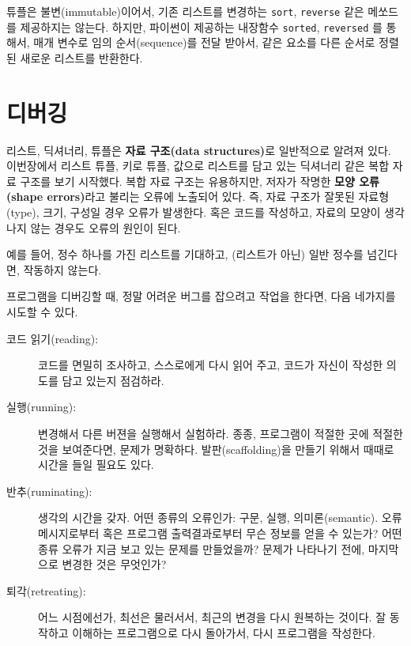 튜플은 불변(immutable)이어서, 기존 리스트를 변경하는 {\tt sort}, {\tt reverse} 같은 메쏘드를 제공하지는 않는다.
하지만, 파이썬이 제공하는 내장함수 {\tt sorted}, {\tt reversed} 를 통해서, 매개 변수로 임의 순서(sequence)를 전달 받아서, 같은 요소를 다른 순서로 정렬된 새로운 리스트를 반환한다.


\section{디버깅}


리스트, 딕셔너리, 튜플은 {\bf 자료 구조(data structures)}로 일반적으로 알려져 있다.
이번장에서 리스트 튜플, 키로 튜플, 값으로 리스트를 담고 있는 딕셔너리 같은 복합 자료 구조를 보기 시작했다.
복합 자료 구조는 유용하지만, 저자가 작명한 {\bf 모양 오류(shape errors)}라고 불리는 오류에 노출되어 있다.
즉, 자료 구조가 잘못된 자료형(type), 크기, 구성일 경우 오류가 발생한다. 
혹은 코드를 작성하고, 자료의 모양이 생각나지 않는 경우도 오류의 원인이 된다.

예를 들어, 정수 하나를 가진 리스트를 기대하고, (리스트가 아닌) 일반 정수를 넘긴다면, 작동하지 않는다.

프로그램을 디버깅할 때, 정말 어려운 버그를 잡으려고 작업을 한다면, 다음 네가지를 시도할 수 있다.

\begin{description}

\item[코드 읽기(reading):] 
코드를 면밀히 조사하고, 스스로에게 다시 읽어 주고, 코드가 자신이 작성한 의도를 담고 있는지  점검하라.

\item[실행(running):] 
변경해서 다른 버젼을 실행해서 실험하라. 
종종, 프로그램이 적절한 곳에 적절한 것을 보여준다면, 문제가 명확하다. 
발판(scaffolding)을 만들기 위해서 때때로 시간을 들일 필요도 있다.

\item[반추(ruminating):] 
생각의 시간을 갖자. 
어떤 종류의 오류인가: 구문, 실행, 의미론(semantic). 
오류 메시지로부터 혹은 프로그램 출력결과로부터 무슨 정보를 얻을 수 있는가?
어떤 종류 오류가 지금 보고 있는 문제를 만들었을까? 
문제가 나타나기 전에, 마지막으로 변경한 것은 무엇인가?

\item[퇴각(retreating):]
어느 시점에선가, 최선은 물러서서, 최근의 변경을 다시 원복하는 것이다. 
잘 동작하고 이해하는 프로그램으로 다시 돌아가서, 다시 프로그램을 작성한다.
\end{description}


